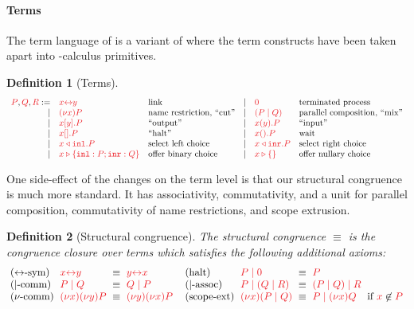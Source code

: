 \documentclass[draft,submission,copyright,creativecommons]{eptcs}
\newtheorem{definition}{Definition}
\begin{document}
\paragraph{Terms}
The term language of \hcp is a variant of \cp where the term constructs have been taken apart into \textpi-calculus primitives.
\begin{definition}[Terms]\label{def:hcp-terms}
  \[
    \begin{array}{rllrll}
      \tm{P}, \tm{Q}, \tm{R}
           :=& \tm{\cpLink{x}{y}}         &\text{link}
      &  \mid& \tm{\piHalt}               &\text{terminated process}
      \\ \mid& \tm{\piNew{x}{P}}          &\text{name restriction, ``cut''}
      &  \mid& \tm{( \piPar{P}{Q} )}      &\text{parallel composition, ``mix''}
      \\ \mid& \tm{\piBoundSend{x}{y}{P}} &\text{``output''}
      &  \mid& \tm{\piRecv{x}{y}{P}}      &\text{``input''}
      \\ \mid& \tm{\piBoundSend{x}{}{P}}  &\text{``halt''}
      &  \mid& \tm{\cpWait{x}{}{P}}       &\text{wait}
      \\ \mid& \tm{\cpInl{x}{P}}          &\text{select left choice}
      &  \mid& \tm{\cpInr{x}{P}}          &\text{select right choice}
      \\ \mid& \tm{\cpCase{x}{P}{Q}}      &\text{offer binary choice}
      &  \mid& \tm{\cpAbsurd{x}}          &\text{offer nullary choice}
    \end{array}
  \]
\end{definition}\noindent
One side-effect of the changes on the term level is that our structural congruence is much more standard. It has associativity, commutativity, and a unit for parallel composition, commutativity of name restrictions, and scope extrusion.
\begin{definition}[Structural congruence]\label{def:hcp-equiv}
  The structural congruence $\equiv$ is the congruence closure over terms which satisfies the following additional axioms:
  \[
    \setlength{\arraycolsep}{3pt}
    \begin{array}{llcllllcll}
        \cpEquivLinkComm
      & \tm{\cpLink{x}{y}}
      & \equiv
      & \tm{\cpLink{y}{x}}
      &
      &
        \hccpEquivMixHalt1
      & \tm{\piPar{P}{\piHalt}}
      & \equiv
      & \tm{P}
      &
      \\
        \hccpEquivMixComm
      & \tm{\piPar{P}{Q}}
      & \equiv
      & \tm{\piPar{Q}{P}}
      &
      &
        \hccpEquivMixAss1
      & \tm{\piPar{P}{( \piPar{Q}{R} )}}
      & \equiv
      & \tm{\piPar{( \piPar{P}{Q} )}{R}}
      &
      \\
        \hccpEquivNewComm
      & \tm{\piNew{x}{\piNew{y}{P}}}
      & \equiv
      & \tm{\piNew{y}{\piNew{x}{P}}}
      &
      &
        \hccpEquivScopeExt1
      & \tm{\piNew{x}{( \piPar{P}{Q} )}}
      & \equiv
      & \tm{\piPar{P}{\piNew{x}{Q}}}
      & \text{if }\notFreeIn{x}{P}
    \end{array}
  \]
\end{definition}\noindent
\end{document}
